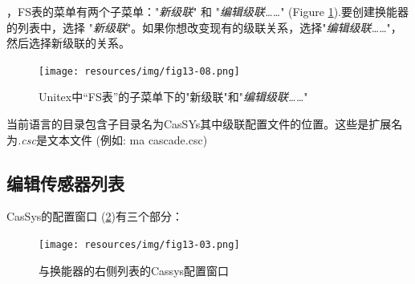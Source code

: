 \bigskip
{}，FS表的菜单有两个子菜单："\textit{新级联}" 和 "\textit{编辑级联……}" (Figure \ref{fig13-08}).要创建换能器的列表中，选择 "\textit{新级联}"。如果你想改变现有的级联关系，选择"\textit{编辑级联……}"，然后选择新级联的关系。

\begin{figure}[!htb]
 \centering
 \texttt{[image: resources/img/fig13-08.png]}
 \caption{Unitex中“FS表”的子菜单下的"新级联"和"\textit{编辑级联……}"}
 \label{fig13-08}
\end{figure}

当前语言的目录包含子目录名为CasSYs其中级联配置文件的位置。这些是扩展名为\textit{.csc}是文本文件 (例如: ma cascade.csc)

\subsection{编辑传感器列表}
\label{subsec:editlistTrans}

CasSys的配置窗口 (\ref{fig13-03})有三个部分：

\begin{figure}[!htb]
  \centering
  \texttt{[image: resources/img/fig13-03.png]}
  \caption{与换能器的右侧列表的Cassys配置窗口}
  \label{fig13-03}
\end{figure}

